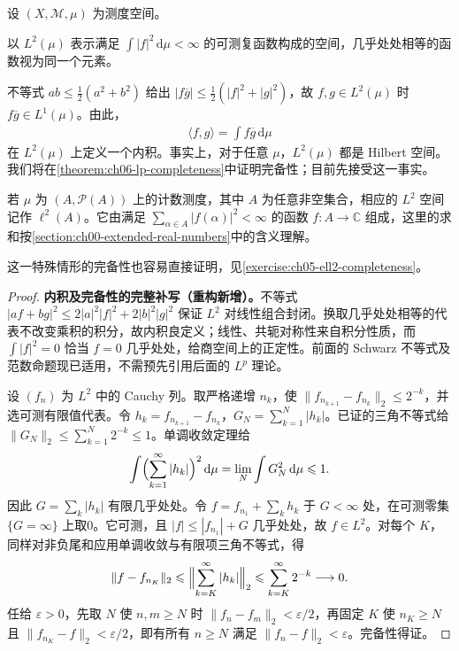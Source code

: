 \documentclass[../../main.tex]{subfiles}
\begin{document}
\begin{example}\label{example:ch05-l2-hilbert}
设 $(X,\mathscr M,\mu)$ 为测度空间。
\begin{definition*}[$L^2(\mu)$]\label{definition:ch05-l2-space}
以 $L^2(\mu)$ 表示满足 $\int|f|^2\,\mathrm d\mu<\infty$ 的可测复函数构成的空间，几乎处处相等的函数视为同一个元素。
\end{definition*}
不等式 $ab\leqslant\tfrac12(a^2+b^2)$ 给出 $|f\overline g|\leqslant\tfrac12(|f|^2+|g|^2)$，故 $f,g\in L^2(\mu)$ 时 $f\overline g\in L^1(\mu)$。由此，
\begin{align*}
\langle f,g\rangle=\int f\overline g\,\mathrm d\mu
\end{align*}
在 $L^2(\mu)$ 上定义一个内积。事实上，对于任意 $\mu$，$L^2(\mu)$ 都是 Hilbert 空间。我们将在\cref{theorem:ch06-lp-completeness}中证明完备性；目前先接受这一事实。
\begin{definition*}[$\ell^2(A)$]\label{definition:ch05-ell2-space}
若 $\mu$ 为 $(A,\mathscr P(A))$ 上的计数测度，其中 $A$ 为任意非空集合，相应的 $L^2$ 空间记作 $\ell^2(A)$。它由满足 $\sum_{\alpha\in A}|f(\alpha)|^2<\infty$ 的函数 $f:A\to\mathbb C$ 组成，这里的求和按\cref{section:ch00-extended-real-numbers}中的含义理解。
\end{definition*}
这一特殊情形的完备性也容易直接证明，见\cref{exercise:ch05-ell2-completeness}。
\end{example}
\begin{proof}
\textbf{内积及完备性的完整补写（重构新增）。}不等式 $|af+bg|^2\leqslant2|a|^2|f|^2+2|b|^2|g|^2$ 保证 $L^2$ 对线性组合封闭。换取几乎处处相等的代表不改变乘积的积分，故内积良定义；线性、共轭对称性来自积分性质，而 $\int|f|^2=0$ 恰当 $f=0$ 几乎处处，给商空间上的正定性。前面的 Schwarz 不等式及范数命题现已适用，不需预先引用后面的 $L^p$ 理论。

设 $(f_n)$ 为 $L^2$ 中的 Cauchy 列。取严格递增 $n_k$，使 $\|f_{n_{k+1}}-f_{n_k}\|_2\leqslant2^{-k}$，并选可测有限值代表。令 $h_k=f_{n_{k+1}}-f_{n_k}$，$G_N=\sum_{k=1}^N|h_k|$。已证的三角不等式给 $\|G_N\|_2\leqslant\sum_{k=1}^N2^{-k}\leqslant1$。单调收敛定理给
\begin{align*}
\int\Bigl(\sum_{k=1}^{\infty}|h_k|\Bigr)^2\,\mathrm d\mu
=\lim_N\int G_N^2\,\mathrm d\mu\leqslant1.
\end{align*}
因此 $G=\sum_k|h_k|$ 有限几乎处处。令 $f=f_{n_1}+\sum_kh_k$ 于 $G<\infty$ 处，在可测零集 $\{G=\infty\}$ 上取0。它可测，且 $|f|\leqslant|f_{n_1}|+G$ 几乎处处，故 $f\in L^2$。对每个 $K$，同样对非负尾和应用单调收敛与有限项三角不等式，得
\begin{align*}
\|f-f_{n_K}\|_2
\leqslant\Bigl\|\sum_{k=K}^{\infty}|h_k|\Bigr\|_2
\leqslant\sum_{k=K}^{\infty}2^{-k}\longrightarrow0.
\end{align*}
任给 $\varepsilon>0$，先取 $N$ 使 $n,m\geqslant N$ 时 $\|f_n-f_m\|_2<\varepsilon/2$，再固定 $K$ 使 $n_K\geqslant N$ 且 $\|f_{n_K}-f\|_2<\varepsilon/2$，即有所有 $n\geqslant N$ 满足 $\|f_n-f\|_2<\varepsilon$。完备性得证。
\end{proof}
\end{document}
